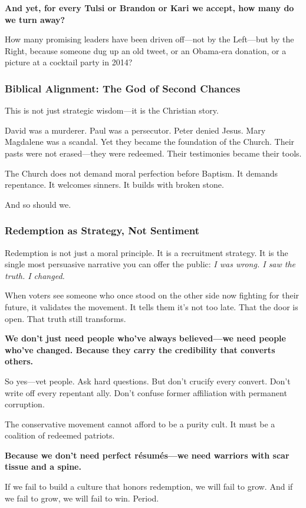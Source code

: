 \textbf{And yet, for every Tulsi or Brandon or Kari we accept, how many do we turn away?}

How many promising leaders have been driven off—not by the Left—but by the Right, because someone dug up an old tweet, or an Obama-era donation, or a picture at a cocktail party in 2014?

\subsubsection*{Biblical Alignment: The God of Second Chances}
This is not just strategic wisdom—it is the Christian story.

David was a murderer. Paul was a persecutor. Peter denied Jesus. Mary Magdalene was a scandal. Yet they became the foundation of the Church. Their pasts were not erased—they were redeemed. Their testimonies became their tools.

The Church does not demand moral perfection before Baptism. It demands repentance. It welcomes sinners. It builds with broken stone.

And so should we.

\subsubsection*{Redemption as Strategy, Not Sentiment}
Redemption is not just a moral principle. It is a recruitment strategy. It is the single most persuasive narrative you can offer the public: \textit{I was wrong. I saw the truth. I changed.}

When voters see someone who once stood on the other side now fighting for their future, it validates the movement. It tells them it’s not too late. That the door is open. That truth still transforms.

\textbf{We don’t just need people who’ve always believed—we need people who’ve changed. Because they carry the credibility that converts others.}

So yes—vet people. Ask hard questions. But don’t crucify every convert. Don’t write off every repentant ally. Don’t confuse former affiliation with permanent corruption.

The conservative movement cannot afford to be a purity cult. It must be a coalition of redeemed patriots.

\textbf{Because we don’t need perfect résumés—we need warriors with scar tissue and a spine.}

If we fail to build a culture that honors redemption, we will fail to grow. And if we fail to grow, we will fail to win. Period.










